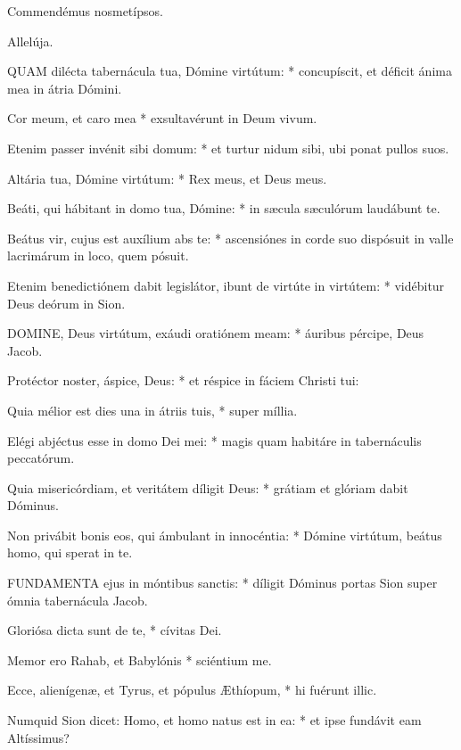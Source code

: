 
 Commendémus nosmetípsos.

  Allelúja.


\lettrine[lines=2]{Q}{UAM} dilécta tabernácula tua, Dómine virtútum: * concupíscit, et déficit ánima mea in átria Dómini.

Cor meum, et caro mea * exsultavérunt in Deum vivum.

Etenim passer invénit sibi domum: * et turtur nidum sibi, ubi ponat pullos suos.

Altária tua, Dómine virtútum: * Rex meus, et Deus meus.

Beáti, qui hábitant in domo tua, Dómine: * in sæcula sæculórum laudábunt te.

Beátus vir, cujus est auxílium abs te: * ascensiónes in corde suo dispósuit in valle lacrimárum in loco, quem pósuit.

Etenim benedictiónem dabit legislátor, ibunt de virtúte in virtútem: * vidébitur Deus deórum in Sion.


\lettrine[lines=2]{D}{OMINE}, Deus virtútum, exáudi oratiónem meam: * áuribus pércipe, Deus Jacob.

Protéctor noster, áspice, Deus: * et réspice in fáciem Christi tui:

Quia mélior est dies una in átriis tuis, * super míllia.

Elégi abjéctus esse in domo Dei mei: * magis quam habitáre in tabernáculis peccatórum.

Quia misericórdiam, et veritátem díligit Deus: * grátiam et glóriam dabit Dóminus.

Non privábit bonis eos, qui ámbulant in innocéntia: * Dómine virtútum, beátus homo, qui sperat in te.


\lettrine[lines=2]{F}{UNDAMENTA} ejus in móntibus sanctis: * díligit Dóminus portas Sion super ómnia tabernácula Jacob.

Gloriósa dicta sunt de te, * cívitas Dei.

Memor ero Rahab, et Babylónis * sciéntium me.

Ecce, alienígenæ, et Tyrus, et pópulus Æthíopum, * hi fuérunt illic.

Numquid Sion dicet: Homo, et homo natus est in ea: * et ipse fundávit eam Altíssimus?

